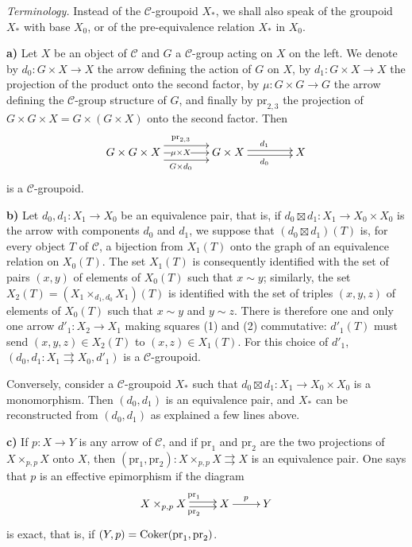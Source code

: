 \emph{Terminology.} Instead of the $\mathcal C$-groupoid $X_*$, we shall also speak of the groupoid $X_*$ with base $X_0$, or of the pre-equivalence relation $X_*$ in $X_0$.

\textbf{a)} Let $X$ be an object of $\mathcal C$ and $G$ a $\mathcal C$-group acting on $X$ on the left. We denote by $d_0:G\times X\to X$ the arrow defining the action of $G$ on $X$, by $d_1:G\times X\to X$ the projection of the product onto the second factor, by $\mu:G\times G\to G$ the arrow defining the $\mathcal C$-group structure of $G$, and finally by $\mathrm{pr}_{2,3}$ the projection of $G\times G\times X=G\times(G\times X)$ onto the second factor. Then
\[
\xymatrix@C=4em{G\times G\times X\ar@<1.5ex>[r]^{\mathrm{pr}_{2,3}}\ar[r]|{\mu\times X}\ar@<-1.5ex>[r]_{G\times d_0}&G\times X\ar@<.5ex>[r]^{d_1}\ar@<-.5ex>[r]_{d_0}&X}
\]
is a $\mathcal C$-groupoid.

\textbf{b)} Let $d_0,d_1:X_1\to X_0$ be an equivalence pair, that is, if $d_0\boxtimes d_1:X_1\to X_0\times X_0$ is the arrow with components $d_0$ and $d_1$, we suppose that $(d_0\boxtimes d_1)(T)$ is, for every object $T$ of $\mathcal C$, a bijection from $X_1(T)$ onto the graph of an equivalence relation on $X_0(T)$. The set $X_1(T)$ is consequently identified with the set of pairs $(x,y)$ of elements of $X_0(T)$ such that $x\sim y$; similarly, the set $X_2(T)=(X_1\times_{d_1,d_0}X_1)(T)$ is identified with the set of triples $(x,y,z)$ of elements of $X_0(T)$ such that $x\sim y$ and $y\sim z$. There is therefore one and only one arrow $d'_1:X_2\to X_1$ making squares (1) and (2) commutative: $d'_1(T)$ must send $(x,y,z)\in X_2(T)$ to $(x,z)\in X_1(T)$. For this choice of $d'_1$, $(d_0,d_1:X_1\rightrightarrows X_0,d'_1)$ is a $\mathcal C$-groupoid.

Conversely, consider a $\mathcal C$-groupoid $X_*$ such that $d_0\boxtimes d_1:X_1\to X_0\times X_0$ is a monomorphism. Then $(d_0,d_1)$ is an equivalence pair, and $X_*$ can be reconstructed from $(d_0,d_1)$ as explained a few lines above.

\textbf{c)} If $p:X\to Y$ is any arrow of $\mathcal C$, and if $\mathrm{pr}_1$ and $\mathrm{pr}_2$ are the two projections of $X\times_{p,p}X$ onto $X$, then $(\mathrm{pr}_1,\mathrm{pr}_2):X\times_{p,p}X\rightrightarrows X$ is an equivalence pair. One says that $p$ is an effective epimorphism if the diagram
\[
\xymatrix{X\times_{p,p}X\ar@<.5ex>[r]^{\mathrm{pr}_1}\ar@<-.5ex>[r]_{\mathrm{pr}_2}&X\ar[r]^p&Y}
\]
is exact, that is, if $(Y,p)=\operatorname{Coker}(\mathrm{pr}_1,\mathrm{pr}_2)$.

